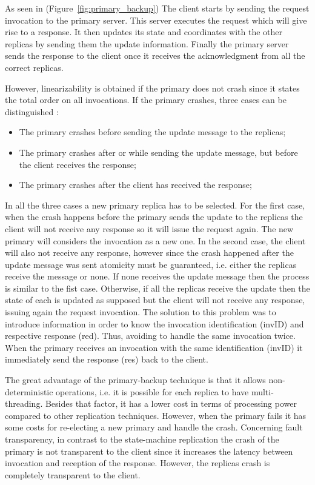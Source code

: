 As seen in (Figure~\ref{fig:primary_backup}) The client starts by sending the request invocation to the primary server. This server executes the request which will give rise to a response. It then updates its state and coordinates with the other replicas by sending them the update information. Finally the primary server sends the response to the client once it receives the acknowledgment from all the correct replicas.

However, linearizability is obtained if the primary does not crash since it states the total order on all invocations. If the primary crashes, three cases can be distinguished \cite{Guerraoui96fault-toleranceby}:

\begin{itemize}
	\item The primary crashes before sending the update message to the replicas;
	\item The primary crashes after or while sending the update message, but before the client receives the response;
	\item The primary crashes after the client has received the response;
\end{itemize}

In all the three cases a new primary replica has to be selected. For the first case, when the crash happens before the primary sends the update to the replicas the client will not receive any response so it will issue the request again. The new primary will considers the invocation as a new one. 
In the second case, the client will also not receive any response, however since the crash happened after the update message was sent atomicity must be guaranteed, i.e. either the replicas receive the message or none. If none receives the update message then the process is similar to the fist case. Otherwise, if all the replicas receive the update then the state of each is updated as supposed but the client will not receive any response, issuing again the request invocation. The solution to this problem was to introduce information in order to know the invocation identification (invID) and respective response (red). Thus, avoiding to handle the same invocation twice. When the primary receives an invocation with the same identification (invID) it immediately send the response (res) back to the client.

The great advantage of the primary-backup technique is that it allows non-deterministic operations, i.e. it is possible for each replica to have multi-threading. Besides that factor, it has a lower cost in terms of processing power compared to other replication techniques. However, when the primary fails it has some costs for re-electing a new primary and handle the crash. Concerning fault transparency, in contrast to the state-machine replication the crash of the primary is not transparent to the client since it increases the latency between invocation and reception of the response. However, the replicas crash is completely transparent to the client.

